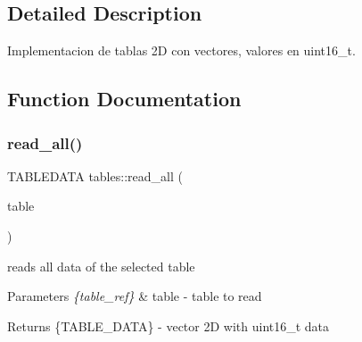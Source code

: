 \subsection{Detailed Description}
Implementacion de tablas 2D con vectores, valores en uint16\+\_\+t. 

\subsection{Function Documentation}
\mbox{\label{namespacetables_a8a1bab94b65aabe4f2b226cdac58b41f}} 
\subsubsection{\texorpdfstring{read\+\_\+all()}{read\_all()}}
{\footnotesize\ttfamily T\+A\+B\+L\+E\+D\+A\+TA tables\+::read\+\_\+all (\begin{DoxyParamCaption}\item[{\hyperlink{structtable__ref}{table\+\_\+ref}}]{table }\end{DoxyParamCaption})}



reads all data of the selected table 


\begin{DoxyParams}{Parameters}
{\em \{table\+\_\+ref\}} & table -\/ table to read \\
\hline
\end{DoxyParams}
\begin{DoxyReturn}{Returns}
\{T\+A\+B\+L\+E\+\_\+\+D\+A\+TA\} -\/ vector 2D with uint16\+\_\+t data 
\end{DoxyReturn}
